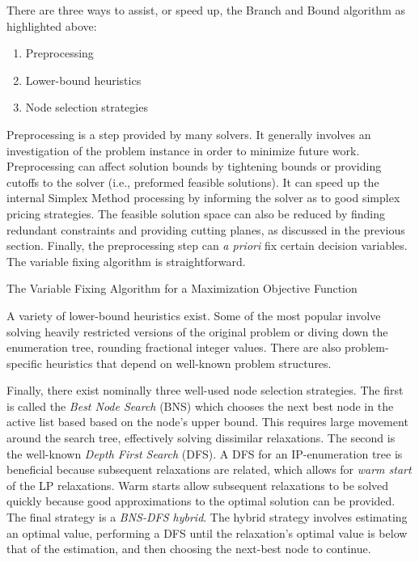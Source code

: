 There are three ways to assist, or speed up, the Branch and Bound algorithm as
highlighted above:
\begin{enumerate}
        \item Preprocessing
        \item Lower-bound heuristics
        \item Node selection strategies
\end{enumerate}

Preprocessing is a step provided by many solvers. It generally involves an
investigation of the problem instance in order to minimize future
work. Preprocessing can affect solution bounds by tightening bounds or providing
cutoffs to the solver (i.e., preformed feasible solutions). It can speed up the
internal Simplex Method processing by informing the solver as to good simplex
pricing strategies. The feasible solution space can also be reduced by finding
redundant constraints and providing cutting planes, as discussed in the previous
section. Finally, the preprocessing step can \textit{a priori} fix certain
decision variables. The variable fixing algorithm is straightforward.

\begin{algorithm}[H]
 \SetAlgoLined
 \caption{The Variable Fixing Algorithm for a Maximization Objective Function}
\end{algorithm}

A variety of lower-bound heuristics exist. Some of the most popular involve
solving heavily restricted versions of the original problem or diving down the
enumeration tree, rounding fractional integer values. There are also
problem-specific heuristics that depend on well-known problem structures.

Finally, there exist nominally three well-used node selection strategies. The
first is called the \textit{Best Node Search} (BNS) which chooses the next best
node in the active list based based on the node's upper bound. This requires
large movement around the search tree, effectively solving dissimilar
relaxations. The second is the well-known \textit{Depth First Search} (DFS). A
DFS for an IP-enumeration tree is beneficial because subsequent relaxations are
related, which allows for \textit{warm start} of the LP relaxations. Warm starts
allow subsequent relaxations to be solved quickly because good approximations to
the optimal solution can be provided. The final strategy is a \textit{BNS-DFS
hybrid}. The hybrid strategy involves estimating an optimal value, performing a
DFS until the relaxation's optimal value is below that of the estimation, and
then choosing the next-best node to continue.
